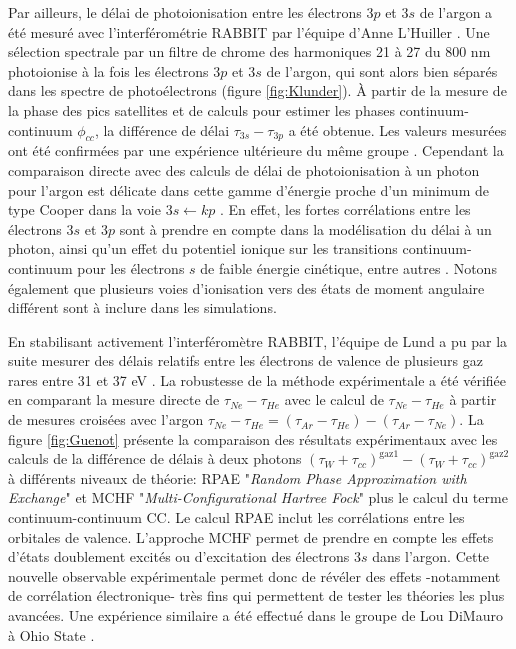 Par ailleurs, le délai de photoionisation entre les électrons $3p$ et $3s$ de l'argon a été mesuré avec l'interférométrie RABBIT par l'équipe d'Anne L'Huiller . Une sélection spectrale par un filtre de chrome des harmoniques 21 à 27 du 800 nm photoionise à la fois les électrons $3p$ et $3s$ de l'argon, qui sont alors bien séparés dans les spectre de photoélectrons (figure \ref{fig:Klunder}). \`A partir de la mesure de la phase des pics satellites et de calculs pour estimer les phases continuum-continuum $\phi_{cc}$, la différence de délai $\tau_{3s} - \tau_{3p}$ a été obtenue. Les valeurs mesurées ont été confirmées par une expérience ultérieure du même groupe . Cependant la comparaison directe avec des calculs de délai de photoionisation à un photon pour l'argon est délicate dans cette gamme d'énergie proche d'un minimum de type Cooper dans la voie $3s \leftarrow kp$ . En effet, les fortes corrélations entre les électrons $3s$ et $3p$ sont à prendre en compte dans la modélisation du délai à un photon, ainsi qu'un effet du potentiel ionique sur les transitions continuum-continuum pour les électrons $s$ de faible énergie cinétique, entre autres . Notons également que plusieurs voies d'ionisation vers des états de moment angulaire différent sont à inclure dans les simulations.

En stabilisant activement l'interféromètre RABBIT, l'équipe de Lund a pu par la suite mesurer des délais relatifs entre les électrons de valence de plusieurs gaz rares entre 31 et 37 eV . La robustesse de la méthode expérimentale a été vérifiée en comparant la mesure directe de  $\tau_{Ne} - \tau_{He}$ avec le calcul de $\tau_{Ne} - \tau_{He}$ à partir de mesures croisées avec l'argon $\tau_{Ne} - \tau_{He} = (\tau_{Ar} - \tau_{He}) - (\tau_{Ar} - \tau_{Ne})$. La figure \ref{fig:Guenot} présente la comparaison des résultats expérimentaux avec les calculs de la différence de délais à deux photons $(\tau_W + \tau_{cc})^{\mathrm{gaz} 1} - (\tau_W + \tau_{cc})^{\mathrm{gaz} 2}$ à différents niveaux de théorie: RPAE "\textit{Random Phase Approximation with Exchange}"  et MCHF "\textit{Multi-Configurational Hartree Fock}"  plus le calcul du terme continuum-continuum CC. Le calcul RPAE inclut les corrélations entre les orbitales de valence. L'approche MCHF permet de prendre en compte les effets d'états doublement excités ou d'excitation des électrons $3s$ dans l'argon. Cette nouvelle observable expérimentale permet donc de révéler des effets -notamment de corrélation électronique- très fins qui permettent de tester les théories les plus avancées. Une expérience similaire a été effectué dans le groupe de Lou DiMauro à Ohio State .

